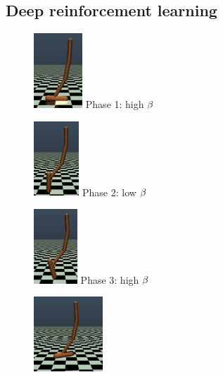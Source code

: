 \subsection{Deep reinforcement learning}
\begin{figure}[h]
    \centering
    \begin{minipage}[b]{0.18\linewidth}
    \centering
    \includegraphics[width=\textwidth,height=2.8cm]{fig/phase_0.png}
    Phase 1: high $\beta$
    \label{fig:phase_0}
    \end{minipage}
    \hspace{0.02cm}
    \begin{minipage}[b]{0.18\linewidth}
    \centering
    \includegraphics[width=\textwidth,height=2.8cm]{fig/phase_1.png}
    Phase 2: low $\beta$
    \label{fig:phase_1}
    \end{minipage}
    \hspace{0.02cm}
    \begin{minipage}[b]{0.18\linewidth}
    \centering
    \includegraphics[width=\textwidth,height=2.8cm]{fig/phase_2.png}
    Phase 3: high $\beta$
    \label{fig:phase_2}
    \end{minipage}
    \hspace{0.02cm}
    \begin{minipage}[b]{0.18\linewidth}
    \centering
    \includegraphics[width=\textwidth,height=2.8cm]{fig/phase_3.png}

\end{minipage}
\end{figure}
